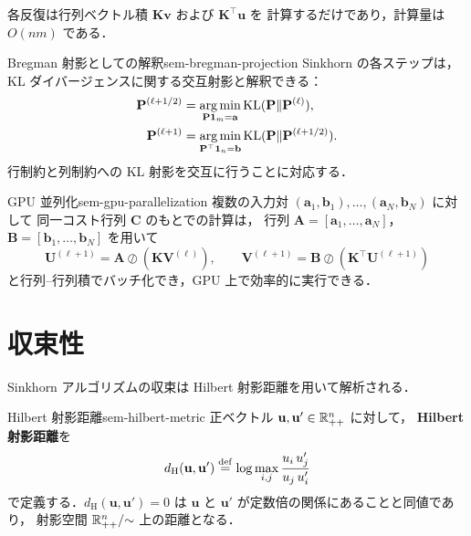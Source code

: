 各反復は行列ベクトル積 $\mathbf{K}\mathbf{v}$ および $\mathbf{K}^\top \mathbf{u}$ を
計算するだけであり，計算量は $O(nm)$ である．

\begin{remark}{Bregman 射影としての解釈}{sem-bregman-projection}
  Sinkhorn の各ステップは，KL ダイバージェンスに関する交互射影と解釈できる：
  \begin{align*}
    \mathbf{P}^{(\ell+1/2)}
      &= \operatorname*{arg\,min}_{\mathbf{P}\mathbf{1}_m = \mathbf{a}} \mathrm{KL}(\mathbf{P} \| \mathbf{P}^{(\ell)}),
    \\
    \mathbf{P}^{(\ell+1)}
      &= \operatorname*{arg\,min}_{\mathbf{P}^\top \mathbf{1}_n = \mathbf{b}}
      \mathrm{KL}(\mathbf{P} \| \mathbf{P}^{(\ell+1/2)}).
  \end{align*}
  行制約と列制約への KL 射影を交互に行うことに対応する．
\end{remark}

\begin{remark}{GPU 並列化}{sem-gpu-parallelization}
  複数の入力対 $(\mathbf{a}_1, \mathbf{b}_1), \ldots, (\mathbf{a}_N, \mathbf{b}_N)$ に対して
  同一コスト行列 $\mathbf{C}$ のもとでの計算は，
  行列 $\mathbf{A} = [\mathbf{a}_1, \ldots, \mathbf{a}_N]$，
  $\mathbf{B} = [\mathbf{b}_1, \ldots, \mathbf{b}_N]$ を用いて
  \[
    \mathbf{U}^{(\ell+1)} = \mathbf{A} \oslash (\mathbf{K} \mathbf{V}^{(\ell)}), \qquad
    \mathbf{V}^{(\ell+1)} = \mathbf{B} \oslash (\mathbf{K}^\top \mathbf{U}^{(\ell+1)})
  \]
  と行列--行列積でバッチ化でき，GPU 上で効率的に実行できる．
\end{remark}

\section{収束性}
\label{sec:sem-sinkhorn-convergence}

Sinkhorn アルゴリズムの収束は Hilbert 射影距離を用いて解析される．

\begin{definition}{Hilbert 射影距離}{sem-hilbert-metric}
  正ベクトル $\mathbf{u}, \mathbf{u}' \in \mathbb{R}_{++}^n$ に対して，
  \textbf{Hilbert 射影距離}を
  \[
    d_{\mathrm{H}}(\mathbf{u}, \mathbf{u}')
    \overset{\mathrm{def}}{=} \log \max_{i,j} \frac{u_i \, u'_j}{u_j \, u'_i}
  \]
  で定義する．$d_{\mathrm{H}}(\mathbf{u}, \mathbf{u}') = 0$ は
  $\mathbf{u}$ と $\mathbf{u}'$ が定数倍の関係にあることと同値であり，
  射影空間 $\mathbb{R}_{++}^n / {\sim}$ 上の距離となる．
\end{definition}

